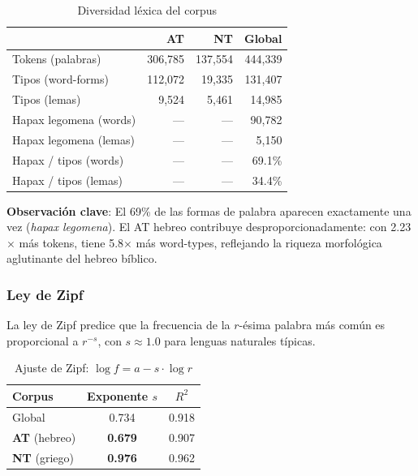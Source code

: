 \documentclass[12pt,a4paper]{article}
\newcommand{\ot}{\textcolor{otcolor}{\textbf{AT}}}
\newcommand{\nt}{\textcolor{ntcolor}{\textbf{NT}}}
\newcommand{\val}[1]{\textcolor{hlcolor}{\textbf{#1}}}
\begin{document}
\begin{table}[H]
\centering
\caption{Diversidad l\'exica del corpus}
\label{tab:lexdiv}
\begin{tabular}{lrrr}
\toprule
& \textbf{\ot{}} & \textbf{\nt{}} & \textbf{Global} \\
\midrule
Tokens (palabras)          & 306,785 & 137,554 & 444,339 \\
Tipos (word-forms)         & 112,072 &  19,335 & 131,407 \\
Tipos (lemas)              &   9,524 &   5,461 &  14,985 \\
Hapax legomena (words)     &     --- &     --- &  90,782 \\
Hapax legomena (lemas)     &     --- &     --- &   5,150 \\
\midrule
Hapax / tipos (words)      &     --- &     --- &  69.1\% \\
Hapax / tipos (lemas)      &     --- &     --- &  34.4\% \\
\bottomrule
\end{tabular}
\end{table}

\textbf{Observaci\'on clave}: El 69\% de las formas de palabra aparecen exactamente una vez
(\emph{hapax legomena}). El AT hebreo contribuye desproporcionadamente: con 2.23$\times$ m\'as
tokens, tiene 5.8$\times$ m\'as word-types, reflejando la riqueza morfol\'ogica aglutinante
del hebreo b\'iblico.

\subsubsection{Ley de Zipf}

La ley de Zipf predice que la frecuencia de la $r$-\'esima palabra m\'as com\'un
es proporcional a $r^{-s}$, con $s \approx 1.0$ para lenguas naturales t\'ipicas.

\begin{table}[H]
\centering
\caption{Ajuste de Zipf: $\log f = a - s \cdot \log r$}
\label{tab:zipf}
\begin{tabular}{lcc}
\toprule
\textbf{Corpus} & \textbf{Exponente $s$} & \textbf{$R^2$} \\
\midrule
Global          & 0.734 & 0.918 \\
\ot{} (hebreo)  & \val{0.679} & 0.907 \\
\nt{} (griego)  & \val{0.976} & 0.962 \\
\bottomrule
\end{tabular}
\end{table}
\end{document}
